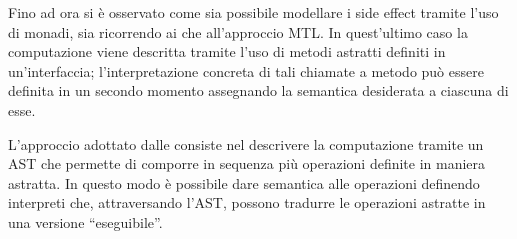 Fino ad ora si è osservato come sia possibile modellare i side effect tramite l'uso di monadi, sia ricorrendo ai  che all'approccio \ac{MTL}. In quest'ultimo caso la computazione viene descritta tramite l'uso di metodi astratti definiti in un'interfaccia; l'interpretazione concreta di tali chiamate a metodo può essere definita in un secondo momento assegnando la semantica desiderata a ciascuna di esse.

L'approccio adottato dalle  consiste nel descrivere la computazione tramite un \ac{AST} che permette di comporre in sequenza più operazioni definite in maniera astratta. In questo modo è possibile dare semantica alle operazioni definendo interpreti che, attraversando l'\ac{AST}, possono tradurre le operazioni astratte in una versione ``eseguibile''.
